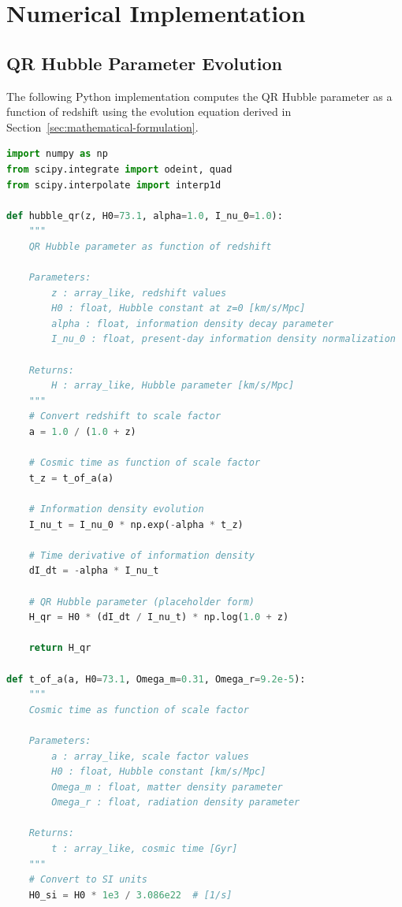 \section{Numerical Implementation}
\label{appendix:numerical}

\subsection{QR Hubble Parameter Evolution}
\label{subsec:hubble-evolution-code}

The following Python implementation computes the QR Hubble parameter as a function of redshift using the evolution equation derived in Section~\ref{sec:mathematical-formulation}.

\begin{lstlisting}[language=Python, caption=QR Hubble Parameter Function]
import numpy as np
from scipy.integrate import odeint, quad
from scipy.interpolate import interp1d

def hubble_qr(z, H0=73.1, alpha=1.0, I_nu_0=1.0):
    """
    QR Hubble parameter as function of redshift

    Parameters:
        z : array_like, redshift values
        H0 : float, Hubble constant at z=0 [km/s/Mpc]
        alpha : float, information density decay parameter
        I_nu_0 : float, present-day information density normalization

    Returns:
        H : array_like, Hubble parameter [km/s/Mpc]
    """
    # Convert redshift to scale factor
    a = 1.0 / (1.0 + z)

    # Cosmic time as function of scale factor
    t_z = t_of_a(a)

    # Information density evolution
    I_nu_t = I_nu_0 * np.exp(-alpha * t_z)

    # Time derivative of information density
    dI_dt = -alpha * I_nu_t

    # QR Hubble parameter (placeholder form)
    H_qr = H0 * (dI_dt / I_nu_t) * np.log(1.0 + z)

    return H_qr

def t_of_a(a, H0=73.1, Omega_m=0.31, Omega_r=9.2e-5):
    """
    Cosmic time as function of scale factor

    Parameters:
        a : array_like, scale factor values
        H0 : float, Hubble constant [km/s/Mpc]
        Omega_m : float, matter density parameter
        Omega_r : float, radiation density parameter

    Returns:
        t : array_like, cosmic time [Gyr]
    """
    # Convert to SI units
    H0_si = H0 * 1e3 / 3.086e22  # [1/s]


\end{lstlisting}
